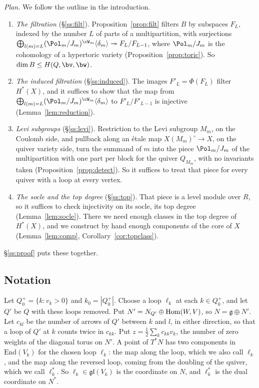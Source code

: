 \documentclass[11pt]{amsart}
\begin{document}
\emph{Plan.}  We follow the outline in the introduction.
\begin{enumerate}[leftmargin=2em,label=(\alph*)]
\item \emph{The filtration} (\S\ref{ss:filt}).  Proposition~\ref{prop:filt}
filters $B$ by subspaces $F_L$, indexed by the number $L$ of parts of a
multipartition, with surjections
$\bigoplus_{l(m)=L}(\Pol_m/J_m)^{\cW_m}\langle\delta_m\rangle\twoheadrightarrow
F_L/F_{L-1}$, where $\Pol_m/J_m$ is the cohomology of a hypertoric variety
(Proposition~\ref{prop:toric}).  So $\dim B\le H(Q,\bv,\bw)$.
\item \emph{The induced filtration} (\S\ref{ss:induced}).  The images
$F'_L=\Phi(F_L)$ filter $H^*(X)$, and it suffices to show that the map from
$\bigoplus_{l(m)=L}(\Pol_m/J_m)^{\cW_m}\langle\delta_m\rangle$ to
$F'_L/F'_{L-1}$ is injective (Lemma~\ref{lem:reduction}).
\item \emph{Levi subgroups} (\S\ref{ss:levi}).  Restriction to the Levi
subgroup $M_m$, on the Coulomb side, and pullback along an \'etale map
$X(M_m)^\circ\to X$, on the quiver variety side, turn the summand of $m$ into
the piece $\Pol_m/J_m$ of the multipartition with one part per block for the
quiver $Q_{M_m}$, with no invariants taken (Proposition~\ref{prop:detect}).
So it suffices to treat that piece for every quiver with a loop at every
vertex.
\item \emph{The socle and the top degree} (\S\ref{ss:top}).  That piece is a
level module over $R$, so it suffices to check injectivity on its socle, its
top degree (Lemma~\ref{lem:socle}).  There we need enough classes in the top
degree of $H^*(X)$, and we construct by hand enough components of the core of
$X$ (Lemma~\ref{lem:comp}, Corollary~\ref{cor:topclass}).
\end{enumerate}
\S\ref{ss:proof} puts these together.

\subsection{Notation}\label{ss:notation}
Let $Q_0^+=\{k:v_k>0\}$ and $k_0=|Q_0^+|$.  Choose a loop $\ell_k$ at each
$k\in Q_0^+$, and let $Q'$ be $Q$ with these loops removed.  Put
$N'=N_{Q'}\oplus\operatorname{Hom}(W,V)$, so $N=\mathfrak g\oplus N'$.  Let $c_{kl}$ be the
number of arrows of $Q'$ between $k$ and $l$, in either direction, so that a
loop of $Q'$ at $k$ counts twice in $c_{kk}$.  Put
$z=\frac12\sum_kc_{kk}v_k$, the number of zero weights of the diagonal
torus on $N'$.  A point of $T^*N$ has two components in $\mathrm{End}(V_k)$
for the chosen loop $\ell_k$: the map along the loop, which we also call
$\ell_k$, and the map along the reversed loop, coming from the doubling of
the quiver, which we call $\ell_k^*$.  So $\ell_k\in\mathfrak{gl}(V_k)$ is the
coordinate on $N$, and $\ell_k^*$ is the dual coordinate on $N^*$.
\end{document}
